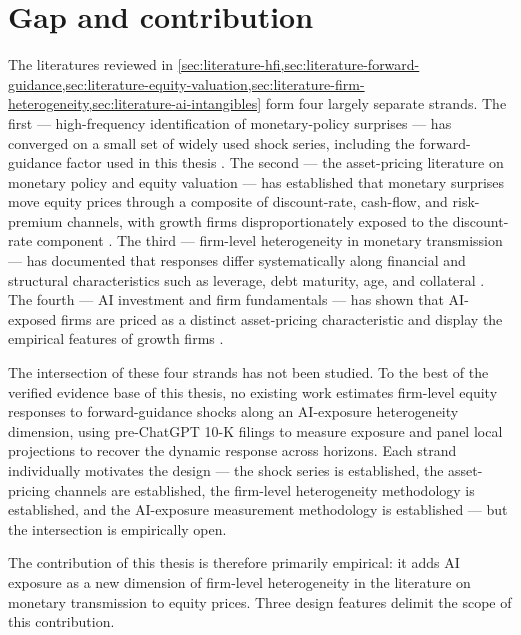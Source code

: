 \section{Gap and contribution}
\label{sec:literature-gap}

The literatures reviewed in
\cref{sec:literature-hfi,sec:literature-forward-guidance,sec:literature-equity-valuation,sec:literature-firm-heterogeneity,sec:literature-ai-intangibles}
form four largely separate strands. The first --- high-frequency
identification of monetary-policy surprises --- has converged on a
small set of widely used shock series, including the forward-guidance
factor used in this thesis \citep{gurkaynakSackSwanson2005,swanson2021}.
The second --- the asset-pricing literature on monetary policy and
equity valuation --- has established that monetary surprises move
equity prices through a composite of discount-rate, cash-flow, and
risk-premium channels, with growth firms disproportionately exposed
to the discount-rate component \citep{bernankeKuttner2005,campbellAmmer1993,campbellPolkVuolteenaho2010}.
The third --- firm-level heterogeneity in monetary transmission ---
has documented that responses differ systematically along financial
and structural characteristics such as leverage, debt maturity, age,
and collateral \citep{cloyneEtAl2023,ottonelloWinberry2020,durante2022,arinEtAl2025}.
The fourth --- AI investment and firm fundamentals --- has shown that
AI-exposed firms are priced as a distinct asset-pricing characteristic
and display the empirical features of growth firms
\citep{anteSaggu2025,babinaEtAl2024,eisfeldtSchubertZhangTaska2023}.

The intersection of these four strands has not been studied. To the
best of the verified evidence base of this thesis, no existing work
estimates firm-level equity responses to forward-guidance shocks
along an AI-exposure heterogeneity dimension, using pre-ChatGPT 10-K
filings to measure exposure and panel local projections to recover
the dynamic response across horizons. Each strand individually
motivates the design --- the shock series is established, the
asset-pricing channels are established, the firm-level heterogeneity
methodology is established, and the AI-exposure measurement methodology
is established --- but the intersection is empirically open.

The contribution of this thesis is therefore primarily empirical: it
adds AI exposure as a new dimension of firm-level heterogeneity in
the literature on monetary transmission to equity prices. Three design
features delimit the scope of this contribution.


